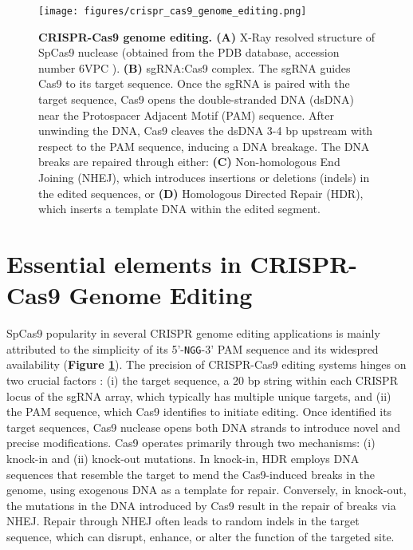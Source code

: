 \documentclass[a4paper, titlepage, openright]{book}
\begin{document}
\begin{figure}[!]
	\centering
	\texttt{[image: figures/crispr\_cas9\_genome\_editing.png]}
	\caption[CRISPR-Cas9 genome editing]{\textbf{CRISPR-Cas9 genome editing. (A)} X-Ray resolved structure of SpCas9 nuclease (obtained from the PDB database, accession number 6VPC \citep{lapinaite2020dna}). \textbf{(B)} sgRNA:Cas9 complex. The sgRNA guides Cas9 to its target sequence. Once the sgRNA is paired with the target sequence, Cas9 opens the double-stranded DNA (dsDNA) near the Protospacer Adjacent Motif (PAM) sequence. After unwinding the DNA, Cas9 cleaves the dsDNA 3-4 bp upstream with respect to the PAM sequence, inducing a DNA breakage. The DNA breaks are repaired through either: \textbf{(C)} Non-homologous End Joining (NHEJ), which introduces insertions or deletions (indels) in the edited sequences, or \textbf{(D)} Homologous Directed Repair (HDR), which inserts a template DNA within the edited segment.}
	\label{fig:crispr-cas9}
\end{figure} 

\section{Essential elements in CRISPR-Cas9 Genome Editing}
SpCas9  popularity in several CRISPR genome editing applications is mainly attributed to the simplicity of its 5'-\texttt{NGG}-3' PAM sequence and its widespred availability (\textbf{Figure \ref{fig:crispr-cas9}}). The precision of CRISPR-Cas9 editing systems hinges on two crucial factors \citep{ran2013genome}: (i) the target sequence, a 20 bp string within each CRISPR locus of the sgRNA array, which typically has multiple unique targets, and (ii) the PAM sequence, which Cas9 identifies to initiate editing. Once identified its target sequences, Cas9 nuclease opens both DNA strands to introduce novel and precise modifications. Cas9 operates primarily through two mechanisms: (i) knock-in and (ii) knock-out mutations. In knock-in, HDR employs DNA sequences that resemble the target to mend the Cas9-induced breaks in the genome, using exogenous DNA as a template for repair. Conversely, in knock-out, the mutations in the DNA introduced by Cas9 result in the repair of breaks via NHEJ. Repair through NHEJ often leads to random indels in the target sequence, which can disrupt, enhance, or alter the function of the targeted site.

\end{document}
